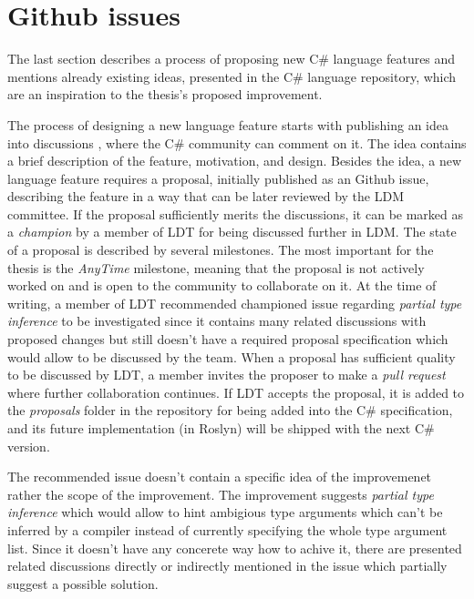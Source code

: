 \section{Github issues}

The last section describes a process of proposing new C\# language features and mentions already existing ideas, presented in the C\# language repository, which are an inspiration to the thesis's proposed improvement.
\par
The process of designing a new language feature starts with publishing an idea into discussions \cite{online:discussions}, where the C\# community can comment on it. 
The idea contains a brief description of the feature, motivation, and design. 
Besides the idea, a new language feature requires a proposal, initially published as an Github issue, describing the feature in a way that can be later reviewed by the \ac{LDM} committee.
If the proposal sufficiently merits the discussions, it can be marked as a \textit{champion} by a member of \ac{LDT} for being discussed further in \ac{LDM}. 
The state of a proposal is described by several milestones. 
The most important for the thesis is the \textit{AnyTime} milestone, meaning that the proposal is not actively worked on and is open to the community to collaborate on it. 
At the time of writing, a member of \ac{LDT} recommended championed issue \cite{online:champion} regarding \textit{partial type inference} to be investigated since it contains many related discussions with proposed changes but still doesn’t have a required proposal specification which would allow to be discussed by the team. 
When a proposal has sufficient quality to be discussed by \ac{LDT}, a member invites the proposer to make a \textit{pull request} where further collaboration continues. 
If \ac{LDT} accepts the proposal, it is added to the \textit{proposals} folder in the repository for being added into the C\# specification, and its future implementation (in Roslyn) will be shipped with the next C\# version. 
\par
The recommended issue doesn't contain a specific idea of the improvemenet rather the scope of the improvement.
The improvement suggests \textit{partial type inference} which would allow to hint ambigious type arguments which can't be inferred by a compiler instead of currently specifying the whole type argument list.
Since it doesn't have any concerete way how to achive it, there are presented related discussions directly or indirectly mentioned in the issue which partially suggest a possible solution.
\par
